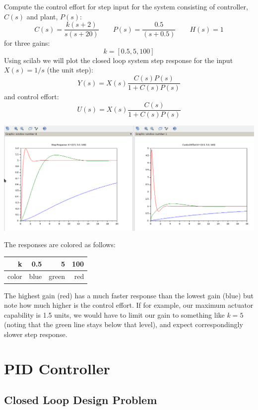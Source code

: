 \begin{Example}
Compute the control effort for step input for the system consisting of controller, $C(s)$ and plant, $P(s)$:
\[
C(s) = \frac  {k(s+2)}  {s(s+20)}  \qquad P(s) = \frac   {0.5}  {(s+0.5)} \qquad H(s) = 1
\]
for three gains:
\[
k = [0.5, 5, 100]
\]
Using scilab we will plot the closed loop system step response for the input $X(s) = 1/s$ (the unit step):
\[
Y(s) = X(s) \frac  {C(s)P(s)}  {1+C(s)P(s)}
\]
and control effort:
\[
U(s) = X(s)\frac {C(s)}  {1+C(s)P(s)}
\]

\begin{centering}
\includegraphics[width=6.25in]{figs09/step_ctl_effort_scilab.png}
\end{centering}

The responses are colored as follows:
\begin{tabular}{r|r|r|r}
k     &  0.5 & 5   & 100 \\
\hline
color & blue & green & red \\
\end{tabular}

The highest gain (red) has a much faster response than the lowest gain (blue) but note how much higher is the
control effort.   If for example, our maximum actuator capability is 1.5 units, we would have to limit our gain to
something like $k=5$ (noting that the green line stays below that level), and expect correspondingly slower step response.
\end{Example}




\section{PID Controller}
\subsection{Closed Loop Design Problem}

